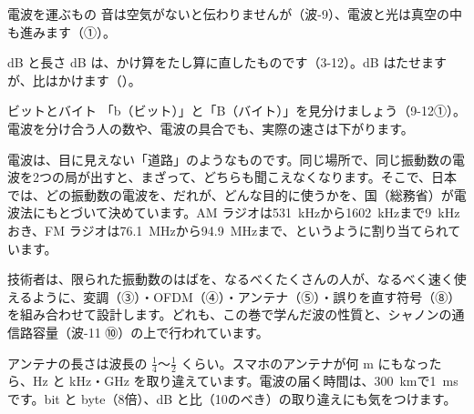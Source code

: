 \begin{tsumazuki}{電波を運ぶもの}
音は空気がないと伝わりませんが（波-9）、電波と光は真空の中も進みます（①）。
\end{tsumazuki}
\begin{tsumazuki}{dB と長さ}
dB は、かけ算をたし算に直したものです（3-12）。dB はたせますが、比はかけます（）。
\end{tsumazuki}
\begin{tsumazuki}{ビットとバイト}
「b（ビット）」と「B（バイト）」を見分けましょう（9-12①）。電波を分け合う人の数や、電波の具合でも、実際の速さは下がります。
\end{tsumazuki}

\begin{phkougaku}[電波は分け合って使う]
電波は、目に見えない「道路」のようなものです。同じ場所で、同じ振動数の電波を2つの局が出すと、まざって、どちらも聞こえなくなります。そこで、日本では、どの振動数の電波を、だれが、どんな目的に使うかを、国（総務省）が電波法にもとづいて決めています。AM ラジオは\qty{531}{kHz}から\qty{1602}{kHz}まで\qty{9}{kHz}おき、FM ラジオは\qty{76.1}{MHz}から\qty{94.9}{MHz}まで、というように割り当てられています。

技術者は、限られた振動数のはばを、なるべくたくさんの人が、なるべく速く使えるように、変調（③）・OFDM（④）・アンテナ（⑤）・誤りを直す符号（⑧）を組み合わせて設計します。どれも、この巻で学んだ波の性質と、シャノンの通信路容量（波-11 ⑩）の上で行われています。
\begin{phketa}[情報を送る波の数]
アンテナの長さは波長の $\tfrac14$〜$\tfrac12$ くらい。スマホのアンテナが何 m にもなったら、Hz と kHz・GHz を取り違えています。電波の届く時間は、\qty{300}{km}で\qty{1}{ms}です。bit と byte（8倍）、dB と比（10のべき）の取り違えにも気をつけます。
\end{phketa}
\end{phkougaku}

